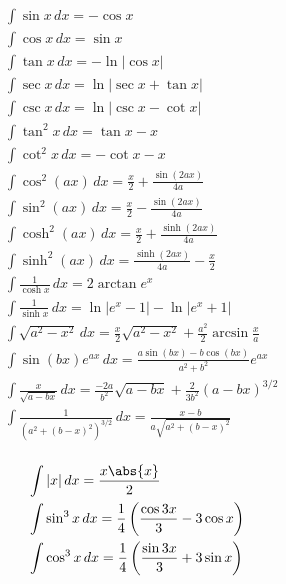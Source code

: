 \begin{minipage}{0.55\textwidth}
\begin{equation}
\begin{split}
    &\int \sin{x}\,dx = -\cos{x} \\
    &\int \cos{x}\,dx = \sin{x} \\
    &\int\tan{x}\,dx  = -\ln{|\cos{x}|} \\
    &\int\sec{x}\,dx  = \ln{|\sec{x}+\tan{x}|}\\
    &\int\csc{x}\,dx  = \ln{|\csc{x}-\cot{x}|}\\
    &\int\tan^2{x}\,dx  = \tan{x}-x \\
    &\int\cot^2{x}\,dx  = -\cot{x}-x \\
    &\int\cos^2{(ax)}\,dx  = \frac{x}{2}+\frac{\sin{(2ax)}}{4a}\\
    &\int\sin^2{(ax)}\,dx  = \frac{x}{2}-\frac{\sin{(2ax)}}{4a}\\
    &\int\cosh^2{(ax)}\,dx  = \frac{x}{2}+\frac{\sinh{(2ax)}}{4a}\\
    &\int\sinh^2{(ax)}\,dx  = \frac{\sinh{(2ax)}}{4a}-\frac{x}{2}\\
    &\int\frac{1}{\cosh{x}}\,dx  = 2\arctan{e^x}\\
    &\int\frac{1}{\sinh{x}}\,dx  = \ln{|e^x-1|}-\ln{|e^x+1|}\\
    &\int\sqrt{a^2-x^2}\,dx  = \frac{x}{2}\sqrt{a^2-x^2}+\frac{a^2}{2}\arcsin{\frac{x}{a}}\\
    &\int\sin{(bx)}e^{ax}\,dx=\frac{a\sin{(bx)}-b\cos{(bx)}}{a^2+b^2}e^{ax}\\
    &\int\frac{x}{\sqrt{a-bx}}\,dx= \frac{-2a}{b^2}\sqrt{a-bx}+\frac{2}{3b^2}(a-bx)^{3/2}\\
    &\int\frac{1}{(a^2+(b-x)^2)^{3/2}}\,dx=\frac{x-b}{a\sqrt{a^2+(b-x)^2}}\\
\end{split}
\nonumber
\end{equation}
\end{minipage}
\newpage
\begin{minipage}{0.55\textwidth}
\begin{equation}
\begin{split}
    &\int|x|\,dx  = \frac{x\abs{x}}{2}\\
    &\int \sin^3{x}\,dx = \frac{1}{4}\left(\frac{\cos{3x}}{3}-3\cos{x}\right)\\
    &\int \cos^3{x}\,dx = \frac{1}{4}\left(\frac{\sin{3x}}{3}+3\sin{x}\right)\\
\end{split}
\nonumber
\end{equation}
\end{minipage}

